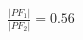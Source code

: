 \documentclass[preview]{standalone}
\begin{document}
\begin{align*}
\frac{|PF_1|}{|PF_2|} = 0.56
\end{align*}
\end{document}
